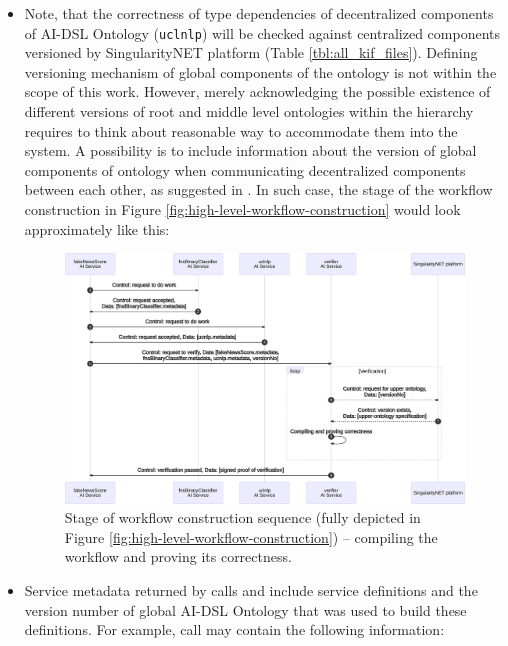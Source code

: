\documentclass[]{report}
\begin{document}
\begin{enumerate}
\begin{itemize}

	\item Note, that the correctness of type dependencies of decentralized components of 
	AI-DSL Ontology (\texttt{uclnlp}) will be checked against centralized
	components versioned by SingularityNET platform (Table \ref{tbl:all_kif_files}). Defining
	versioning mechanism of global components of the ontology is not within the scope 
	of this work. However, merely acknowledging the possible existence of different 
	versions of root and middle level ontologies within the hierarchy requires to 
	think about reasonable way to accommodate them into the system. A possibility 
	is to include information about the version of global components of ontology when 
	communicating decentralized components between each other, 
	as suggested in \cite{YvesHellenschmidt2002}. 
	In such case, the stage  of the workflow construction 
	in Figure \ref{fig:high-level-workflow-construction} would look approximately like this:
	
\begin{figure}[H]
	\centering
	\includegraphics[width=1\textwidth]{../../../ontology/images/verification_for_workflow_correctness.png}
	\captionsetup{width=0.9\linewidth}
	\caption{\label{fig:verification-sequence}Stage  of workflow construction 
		sequence (fully depicted in Figure \ref{fig:high-level-workflow-construction}) -- compiling the workflow and
		proving its correctness.}
\end{figure}	
	
	\item Service metadata returned by calls  and  include service definitions
	and the version number of global AI-DSL Ontology that was used to build these definitions. For
	example, call  may contain the following information:


\end{itemize}
\end{enumerate}
\end{document}
